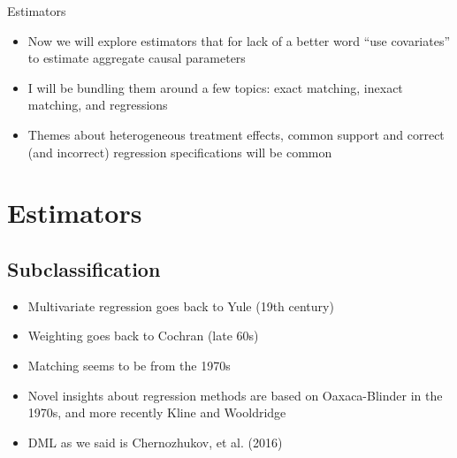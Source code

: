 \documentclass{beamer}
\begin{document}
\begin{frame}{Estimators}

\begin{itemize}

\item Now we will explore estimators that for lack of a better word ``use covariates'' to estimate aggregate causal parameters
\item I will be bundling them around a few topics: exact matching, inexact matching, and regressions
\item Themes about heterogeneous treatment effects, common support and correct (and incorrect) regression specifications will be common

\end{itemize}

\end{frame}





\section{Estimators}

\subsection{Subclassification}

\begin{frame}
\begin{itemize}

\item Multivariate regression goes back to Yule (19th century)
\item Weighting goes back to Cochran (late 60s)
\item Matching seems to be from the 1970s
\item Novel insights about regression methods are based on Oaxaca-Blinder in the 1970s, and more recently Kline and Wooldridge
\item DML as we said is Chernozhukov, et al. (2016) 
\end{itemize}

\end{frame}
\end{document}
